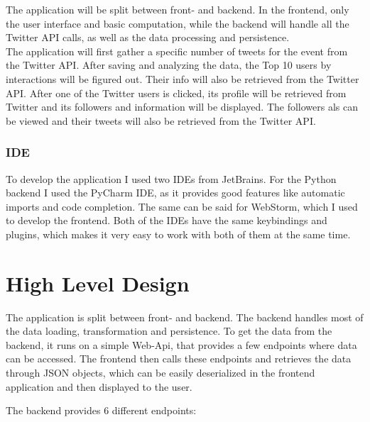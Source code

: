 \documentclass[a4paper,oneside,11pt]{scrreprt}
\begin{document}
The application will be split between front- and backend. In the frontend, only the user interface and basic computation, while the backend will handle all the Twitter API calls, as well as the data processing and persistence. \\

The application will first gather a specific number of tweets for the event from the Twitter API. After saving and analyzing the data, the Top 10 users by interactions will be figured out. Their info will also be retrieved from the Twitter API. After one of the Twitter users is clicked, its profile will be retrieved from Twitter and its followers and information will be displayed. The followers als can be viewed and their tweets will also be retrieved from the Twitter API.

\subsection{IDE}

To develop the application I used two IDEs from JetBrains. For the Python backend I used the PyCharm IDE, as it provides good features like automatic imports and code completion. The same can be said for WebStorm, which I used to develop the frontend. Both of the IDEs have the same keybindings and plugins, which makes it very easy to work with both of them at the same time.


\chapter{High Level Design}
The application is split between front- and backend. The backend handles most of the data loading, transformation and persistence. To get the data from the backend, it runs on a simple Web-Api, that provides a few endpoints where data can be accessed. The frontend then calls these endpoints and retrieves the data through JSON objects, which can be easily deserialized in the frontend application and then displayed to the user.

The backend provides 6 different endpoints:
\end{document}
